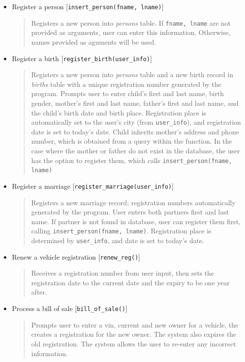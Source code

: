 \documentclass[10pt, a4paper]{article}
\begin{document}
{\begin{itemize}
\item Register a person [\texttt{insert\_person(fname, lname)}]
	\begin{quotation}
	\noindent Registers a new person into \emph{persons} table. If \texttt{fname, lname} are not provided as arguments, user can enter this information. Otherwise, names provided as aguments will be used. 
	\end{quotation}
	
\item Register a birth [\texttt{register\_birth(user\_info)}]
	\begin{quotation}
	\noindent Registers a new person into \emph{persons} table and a new birth record in \emph{births} table with a unique registration number generated by the program. Prompts user to enter child's first and last name, birth gender, mother's first and last name, father's first and last name, and the child's birth date and birth place. Registration place is automatically set to the user's city (from \texttt{user\_info}), and registration date is set to today's date. Child inherits mother's address and phone number, which is obtained from a query within the function. In the case where the mother or father do not exist in the database, the user has the option to register them, which calls \texttt{insert\_person(fname, lname)}
	\end{quotation}
	
\item Register a marriage [\texttt{register\_marriage(user\_info)}]
	\begin{quotation}
	\noindent Registers a new marriage record; registration numbers automatically generated by the program. User enters both partners first and last name. If partner is not found in database, user can register them first, calling \texttt{insert\_person(fname, lname)}. Registration place is determined by \texttt{user\_info}, and date is set to today's date. 
	\end{quotation}
	
\item Renew a vehicle registration [\texttt{renew\_reg()}]
	\begin{quotation}
	\noindent Receives a registration number from user input, then sets the registration date to the current date and the expiry to be one year after.
	\end{quotation}

\item Process a bill of sale [\texttt{bill\_of\_sale()}]
	\begin{quotation}
	\noindent Prompts user to enter a vin, current and new owner for a vehicle, the creates a registration for the new owner. The system also expires the old registration. The system allows the user to re-enter any incorrect information.
	\end{quotation}


\end{itemize}}
\end{document}
